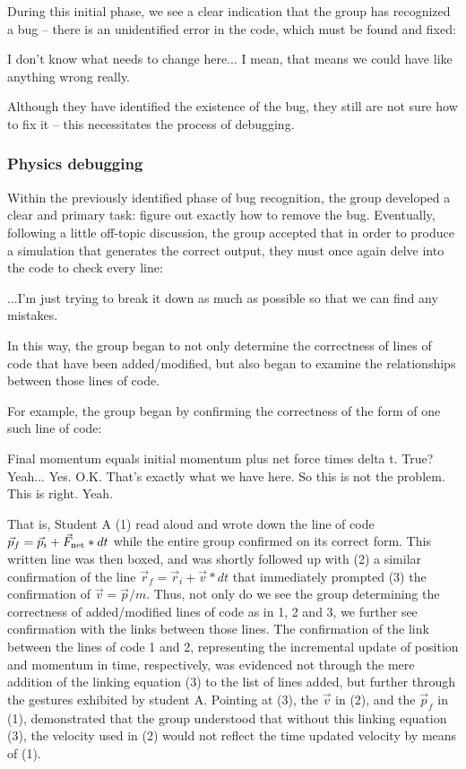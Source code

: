 \documentclass{msuphddissertation}
\begin{document}
\begin{doublespace}
During this initial phase, we see a clear indication that the group has recognized a bug -- there is an unidentified error in the code, which must be found and fixed: \begin{description}
\SA I don't know what needs to change here...
\SD  I mean, that means we could have like anything wrong really.\end{description}  Although they have identified the existence of the bug, they still are not sure how to fix it -- this necessitates the
process of debugging.

\subsubsection{Physics debugging}

Within the previously identified phase of bug recognition, the group developed a clear and primary task: figure out exactly how to remove the bug. Eventually, following a little off-topic discussion, the group accepted that in order to produce a simulation that generates the correct output, they must once again delve into the code to check every line:\begin{description}
\SA ...I'm just trying to break it down as much as possible so that we can find any mistakes.\end{description}  In this way, the group began to not only determine the correctness of lines of code that have been added/modified, but also began to examine the relationships between those lines of code.

For example, the group began by confirming the correctness of the form of one such line of code:\begin{description}
\SA Final momentum equals initial momentum
plus net force times delta t. True?
\SC Yeah...
\SB Yes.
\SA O.K. That's exactly what we have here. So this is not the problem. This is right.
\SD Yeah.\end{description}  That is, Student A (1) read aloud and wrote down the
line of code $\vec{p}_{f} = \vec{p}_{i} + \vec{F}_{\rm net}*dt$ while the entire group confirmed on its correct form.  This written line was then boxed, and was shortly followed up with (2) a similar confirmation of the line $\vec{r}_{f} = \vec{r}_{i} + \vec{v}*dt$ that immediately
prompted (3) the confirmation of $\vec{v} = \vec{p}/m$. Thus, not only do we see the group determining the correctness of added/modified lines of code as in 1, 2 and 3, we further see confirmation with the links between those lines. The confirmation of the link between the lines of code 1 and 2, representing the incremental update of position and momentum in time, respectively, was evidenced not through the mere addition of the linking equation (3) to the list of lines added, but further through the gestures exhibited by student A. Pointing at (3), the $\vec{v}$ in (2), and the $\vec{p}_{f}$ in (1), demonstrated that the group understood that without this linking equation (3), the velocity used in (2) would not reflect the time updated velocity by means of (1).


\end{doublespace}
\end{document}
